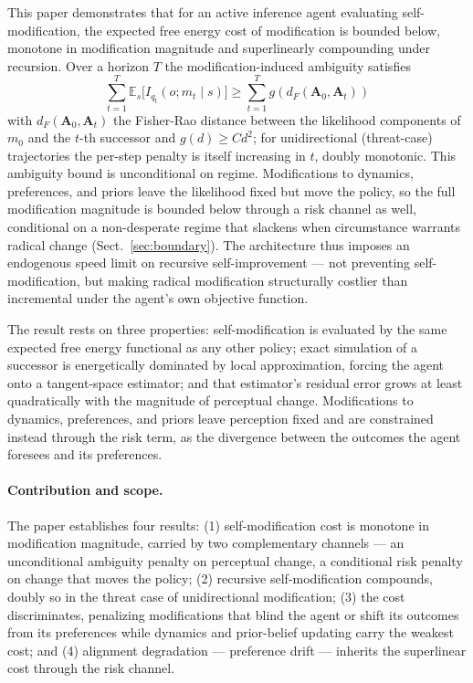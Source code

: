 \documentclass[runningheads]{llncs}
\begin{document}
This paper demonstrates that for an active inference agent \cite{friston2010,parr2022} evaluating self-modification, the expected free energy cost of modification is bounded below, monotone in modification magnitude and superlinearly compounding under recursion. Over a horizon $T$ the modification-induced ambiguity satisfies
\begin{equation}
\sum_{t=1}^{T} \mathbb{E}_s\bigl[I_{q_t}(o; m_t \mid s)\bigr] \geq \sum_{t=1}^{T} g(d_F(\mathbf{A}_0, \mathbf{A}_t))
\end{equation}
with $d_F(\mathbf{A}_0, \mathbf{A}_t)$ the Fisher-Rao distance between the likelihood components of $m_0$ and the $t$-th successor and $g(d) \geq C d^2$; for unidirectional (threat-case) trajectories the per-step penalty is itself increasing in $t$, doubly monotonic. This ambiguity bound is unconditional on regime. Modifications to dynamics, preferences, and priors leave the likelihood fixed but move the policy, so the full modification magnitude is bounded below through a risk channel as well, conditional on a non-desperate regime that slackens when circumstance warrants radical change (Sect.~\ref{sec:boundary}). The architecture thus imposes an endogenous speed limit on recursive self-improvement --- not preventing self-modification, but making radical modification structurally costlier than incremental under the agent's own objective function.

The result rests on three properties: self-modification is evaluated by the same expected free energy functional as any other policy; exact simulation of a successor is energetically dominated by local approximation, forcing the agent onto a tangent-space estimator; and that estimator's residual error grows at least quadratically with the magnitude of perceptual change. Modifications to dynamics, preferences, and priors leave perception fixed and are constrained instead through the risk term, as the divergence between the outcomes the agent foresees and its preferences.

\paragraph{Contribution and scope.} The paper establishes four results: (1) self-modification cost is monotone in modification magnitude, carried by two complementary channels --- an unconditional ambiguity penalty on perceptual change, a conditional risk penalty on change that moves the policy; (2) recursive self-modification compounds, doubly so in the threat case of unidirectional modification; (3) the cost discriminates, penalizing modifications that blind the agent or shift its outcomes from its preferences while dynamics and prior-belief updating carry the weakest cost; and (4) alignment degradation --- preference drift --- inherits the superlinear cost through the risk channel.
\end{document}
